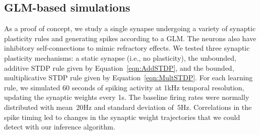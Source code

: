 \subsection{GLM-based simulations}
As a proof of concept, we study a single synapse undergoing a variety
of synaptic plasticity rules and generating spikes according to a
GLM. The neurons also have inhibitory self-connections to mimic
refractory effects. We tested three synaptic plasticity mechanisms: a
static synapse (i.e., no plasticity), the unbounded, additive STDP
rule given by Equation~\ref{eqn:AddSTDP}, and the bounded,
multiplicative STDP rule given by Equation~\ref{eqn:MultSTDP}. For
each learning rule, we simulated 60 seconds of spiking activity at
1kHz temporal resolution, updating the synaptic weights every 1s. The
baseline firing rates were normally distributed with mean~$20$Hz and
standard deviation of~$5$Hz. Correlations in the spike timing led to
changes in the synaptic weight trajectories that we could detect with
our inference algorithm.


